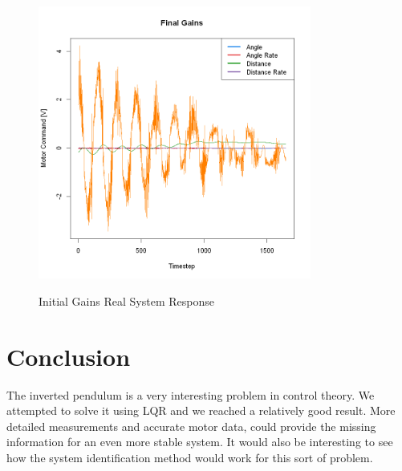 \documentclass{article}
\begin{document}
\begin{figure}[H]
    \caption{Initial Gains Real System Response}
    \centering
    \includegraphics[width=0.8\textwidth]{finalGains.png}
    \label{goodRobot}
\end{figure}

\section {Conclusion}
The inverted pendulum is a very interesting problem in control theory. We attempted to solve it using LQR and we reached a relatively good result. More detailed measurements and accurate motor data, could provide the missing information for an even more stable system. It would also be interesting to see how the system identification method would work for this sort of problem.
\end{document}
